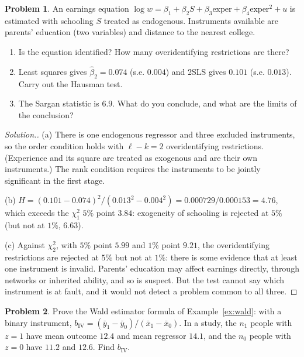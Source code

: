 \documentclass[11pt,a4paper]{article}
\numberwithin{equation}{section}
\theoremstyle{definition}
\newtheorem{problemx}{Problem}[subsection]
\newenvironment{problem}{\begin{problemx}}{\end{problemx}}
\newenvironment{solution}
  {\renewcommand{\qedsymbol}{}\begin{proof}[\textit{Solution}.]}
  {\end{proof}}
\begin{document}
\begin{problem}
An earnings equation $\log w = \beta_1 + \beta_2S + \beta_3\text{exper} + \beta_4\text{exper}^2 + u$ is estimated with schooling $S$ treated as endogenous. Instruments available are
parents' education (two variables) and distance to the nearest college.
\begin{enumerate}[label=(\alph*)]
\item Is the equation identified? How many overidentifying restrictions are there?
\item Least squares gives $\hat\beta_2 = 0.074$ (s.e. $0.004$) and 2SLS gives $0.101$ (s.e. $0.013$). Carry out the Hausman test.
\item The Sargan statistic is $6.9$. What do you conclude, and what are the limits of the conclusion?
\end{enumerate}
\end{problem}

\begin{solution}
(a) There is one endogenous regressor and three excluded instruments, so the order condition holds with $\ell - k = 2$ overidentifying restrictions.
(Experience and its square are treated as exogenous and are their own instruments.) The rank condition requires the instruments to be jointly
significant in the first stage.

(b) $H = (0.101 - 0.074)^2/(0.013^2 - 0.004^2) = 0.000729/0.000153 = 4.76$, which exceeds the $\chi^2_1$ $5\%$ point $3.84$: exogeneity of schooling is rejected at $5\%$ (but not at $1\%$,
$6.63$).

(c) Against $\chi^2_2$, with $5\%$ point $5.99$ and $1\%$ point $9.21$, the overidentifying restrictions are rejected at $5\%$ but not at $1\%$: there is some evidence that at
least one instrument is invalid. Parents' education may affect earnings directly, through networks or inherited ability, and so is suspect. But
the test cannot say which instrument is at fault, and it would not detect a problem common to all three.
\end{solution}

\begin{problem}
Prove the Wald estimator formula of Example~\ref{ex:wald}: with a binary instrument, $b_{\text{IV}} = (\bar y_1 - \bar y_0)/(\bar x_1 - \bar x_0)$. In a study, the $n_1$ people with $z = 1$ have mean
outcome $12.4$ and mean regressor $14.1$, and the $n_0$ people with $z = 0$ have $11.2$ and $12.6$. Find $b_{\text{IV}}$.
\end{problem}
\end{document}
